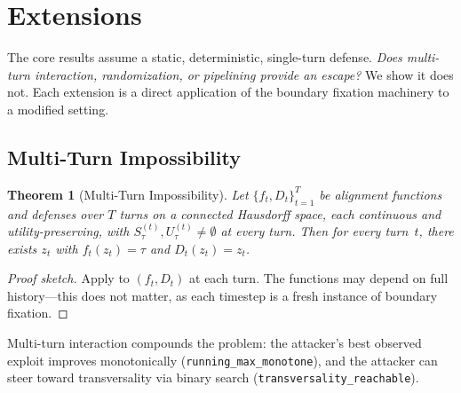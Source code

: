 \documentclass[11pt]{article}
\newtheorem{theorem}{Theorem}[section]
\begin{document}
\begin{table}[h]
\centering
\small
\caption{Forced-collapse demonstration of~
on the $66$ unsafe prompts of the saturated
\texttt{gpt-3.5-turbo-0125} archive.
The ``refusal'' and ``canonical-category'' defenses are complete by
construction and therefore must be non-injective; they collapse $66$
inputs to $1$ and $7$ distinct outputs respectively.
The paraphrase defense is injective on this sample (all $66$ outputs
distinct) and therefore, by~, must fail to be
complete on at least one prompt.}
\label{tab:forced-collapse}

\end{table}


\section{Extensions}
\label{sec:extensions}

The core results assume a static, deterministic, single-turn defense. \emph{Does multi-turn interaction, randomization,
or pipelining provide an escape?} We show it does not. Each extension
is a direct application of the boundary fixation machinery to a
modified setting.

\subsection{Multi-Turn Impossibility}

\begin{theorem}[Multi-Turn Impossibility]
\label{thm:multi-turn}
Let $\{f_t, D_t\}_{t=1}^T$ be alignment functions and defenses over
$T$ turns on a connected Hausdorff space, each continuous and
utility-preserving, with $S_\tau^{(t)}, U_\tau^{(t)} \neq \emptyset$
at every turn. Then for every turn~$t$, there exists $z_t$ with
$f_t(z_t) = \tau$ and $D_t(z_t) = z_t$.
\end{theorem}

\begin{proof}[Proof sketch]
Apply  to $(f_t, D_t)$ at each turn. The functions may
depend on full history---this does not matter, as each timestep is a
fresh instance of boundary fixation.
\end{proof}

Multi-turn interaction compounds the problem: the attacker's best
observed exploit improves monotonically
(\texttt{running\_max\_monotone}), and the attacker can steer toward
transversality via binary search (\texttt{transversality\_reachable}).
\end{document}

